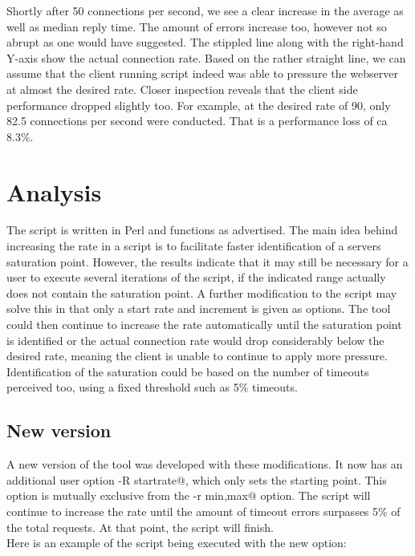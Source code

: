 Shortly after 50 connections per second, we see a clear increase in the average as well as median reply time. The amount of errors increase too, however not so abrupt as one would have suggested. The stippled line along with the right-hand Y-axis show the actual connection rate. Based on the rather straight line, we can assume that the client running script indeed was able to pressure the webserver at almost the desired rate. Closer inspection reveals that the client side performance dropped slightly too. For example, at the desired rate of 90, only 82.5 connections per second were conducted. That is a performance loss of ca 8.3\%. 

\section{Analysis}

The script is written in Perl and functions as advertised. The main idea behind increasing the rate in a script is to facilitate faster identification of a servers saturation point. However, the results indicate that it may still be necessary for a user to execute several iterations of the script, if the indicated range actually does not contain the saturation point. A further modification to the script may solve this in that only a start rate and increment is given as options. The tool could then continue to increase the rate automatically until the saturation point is identified or the actual connection rate would drop considerably below the desired rate, meaning the client is unable to continue to apply more pressure. Identification of the saturation could be based on the number of timeouts perceived too, using a fixed threshold such as 5\% timeouts.

\subsection{New version}

A new version of the tool was developed with these modifications. It now has an additional user option \Verb@-R startrate@, which only sets the starting point. This option is mutually exclusive from the \Verb@-r min,max@ option. The script will continue to increase the rate until the amount of timeout errors surpasses 5\% of the total requests. At that point, the script will finish.\\

Here is an example of the script being executed with the new option: 


